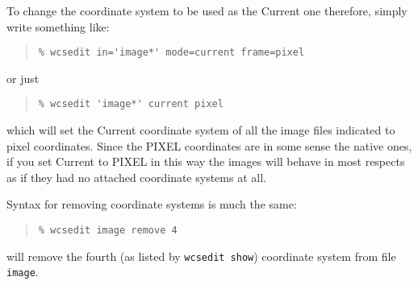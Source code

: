 \documentclass[twoside,11pt]{article}
\renewcommand{\_}{\texttt{\symbol{95}}}
\newenvironment{myquote}{\begin{quote}\begin{small}}{\end{small}\end{quote}}
\begin{document}
To change the coordinate system to be used as the Current one
therefore, simply write something like:
\begin{myquote}
\begin{verbatim}
% wcsedit in='image*' mode=current frame=pixel
\end{verbatim}
\end{myquote}
or just
\begin{myquote}
\begin{verbatim}
% wcsedit 'image*' current pixel
\end{verbatim}
\end{myquote}
which will set the Current coordinate system of all the image files
indicated to pixel coordinates.
Since the PIXEL coordinates are in some sense the native ones,
if you set Current to PIXEL in this way
the images will behave in most respects as if they had no attached
coordinate systems at all.

Syntax for removing coordinate systems is much the same:
\begin{myquote}
\begin{verbatim}
% wcsedit image remove 4
\end{verbatim}
\end{myquote}
will remove the fourth (as listed by {\tt wcsedit show}) coordinate
system from file {\tt image}.
\end{document}
